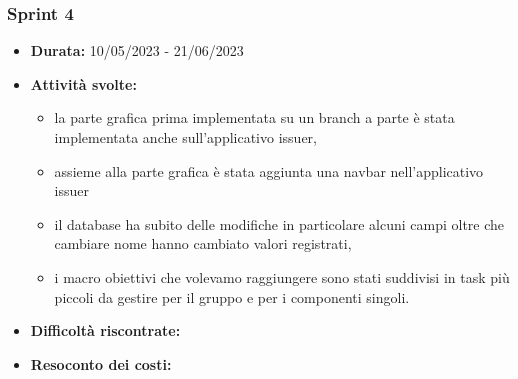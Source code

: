 \subsubsection{Sprint 4}
\begin{itemize}
    \item \textbf{Durata:} 10/05/2023 - 21/06/2023 
    \item \textbf{Attività svolte:}
    \begin{itemize}
        \item la parte grafica prima implementata su un branch a parte è stata implementata anche sull'applicativo issuer,
        \item assieme alla parte grafica è stata aggiunta una navbar nell'applicativo issuer 
        \item il database ha subito delle modifiche in particolare alcuni campi oltre che cambiare nome hanno cambiato valori registrati,
        \item i macro obiettivi che volevamo raggiungere sono stati suddivisi in task più piccoli da gestire per il gruppo e per i componenti singoli.
    \end{itemize}
    \item \textbf{Difficoltà riscontrate:}
    \item \textbf{Resoconto dei costi:}
    \end{itemize}